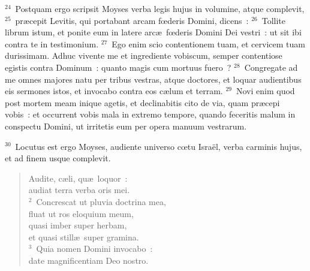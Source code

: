 ${}^{24}$~Postquam ergo scripsit Moyses verba legis hujus in volumine, atque complevit,
${}^{25}$~pr\ae cepit Levitis, qui portabant arcam fœderis Domini, dicens~:
${}^{26}$~Tollite librum istum, et ponite eum in latere arc\ae\ fœderis Domini Dei vestri~: ut sit ibi contra te in testimonium.
${}^{27}$~Ego enim scio contentionem tuam, et cervicem tuam durissimam. Adhuc vivente me et ingrediente vobiscum, semper contentiose egistis contra Dominum~: quanto magis cum mortuus fuero~?
${}^{28}$~Congregate ad me omnes majores natu per tribus vestras, atque doctores, et loquar audientibus eis sermones istos, et invocabo contra eos c\ae lum et terram.
${}^{29}$~Novi enim quod post mortem meam inique agetis, et declinabitis cito de via, quam pr\ae cepi vobis~: et occurrent vobis mala in extremo tempore, quando feceritis malum in conspectu Domini, ut irritetis eum per opera manuum vestrarum.


${}^{30}$~Locutus est ergo Moyses, audiente universo cœtu Isra\"el, verba carminis hujus, et ad finem usque complevit.
\begin{flushleft}\begin{verse}\vspace{-19pt}\hspace{6pt}Audite, c\ae li, qu\ae\ loquor~:\\\hspace{6pt} audiat terra verba oris mei.\\
${}^{2}$~Concrescat ut pluvia doctrina mea,\\ fluat ut ros eloquium meum,\\ quasi imber super herbam,\\ et quasi still\ae\ super gramina.\\
${}^{3}$~Quia nomen Domini invocabo~:\\ date magnificentiam Deo nostro.\end{verse}\end{flushleft}


